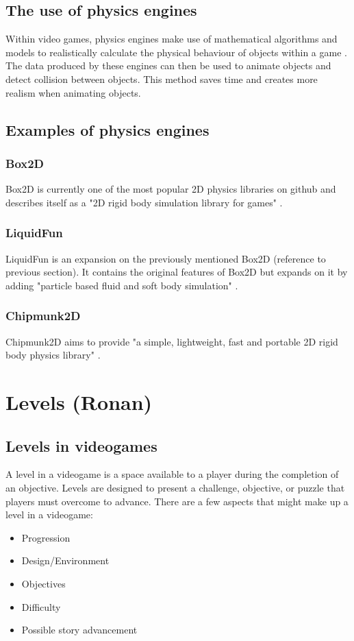 \documentclass{article} %
\begin{document}
\subsection{The use of physics engines}

Within video games, physics engines make use of mathematical algorithms and models to realistically calculate the physical behaviour of objects within a game \cite{Ipacs_2023}. The data produced by these engines can then be used to animate objects and detect collision between objects. This method saves time and creates more realism when animating objects.

\subsection{Examples of physics engines}

\subsubsection{Box2D}

Box2D is currently one of the most popular 2D physics libraries on github and describes itself as a "2D rigid body simulation library for games" \cite{Catto_2024}.

\subsubsection{LiquidFun}

LiquidFun is an expansion on the previously mentioned Box2D (reference to previous section). It contains the original features of Box2D but expands on it by adding "particle based fluid and soft body simulation" \cite{Miles_2014}.

\subsubsection{Chipmunk2D}

Chipmunk2D aims to provide "a simple, lightweight, fast and portable 2D rigid body physics library" \cite{Slembcke_2023}.

\newpage

\section{Levels (Ronan)}
\subsection{Levels in videogames}
A level in a videogame is a space available to a player during 
the completion of an objective. Levels are designed to present a challenge, 
objective, or puzzle that players must overcome to advance. 
There are a few aspects that might make up a level in a videogame:
\begin{itemize}
	\item Progression
	\item Design/Environment
	\item Objectives
	\item Difficulty
	\item Possible story advancement
\end{itemize}
\end{document}

